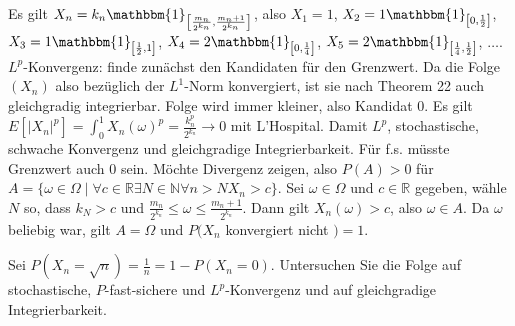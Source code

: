 \documentclass{article}
\begin{document}
Es gilt $X_n=k_n\mathbbm{1}_{\left[\frac{m_n}{2^{k_n}},\frac{m_n+1}{2^{k_n}}\right]}$, also $X_1=1$, $X_2=1\mathbbm{1}_{\left[0,\frac{1}{2}\right]}$, $X_3=1\mathbbm{1}_{\left[\frac{1}{2},1\right]}$, $X_4=2\mathbbm{1}_{\left[0,\frac{1}{4}\right]}$, $X_5=2\mathbbm{1}_{\left[\frac{1}{4},\frac{1}{2}\right]}$, $\dots$.
$L^p$-Konvergenz: finde zunächst den Kandidaten für den Grenzwert.
Da die Folge $(X_n)$ also bezüglich der $L^1$-Norm konvergiert, ist sie nach Theorem 22 auch gleichgradig integrierbar. Folge wird immer kleiner, also Kandidat 0.
Es gilt $E[|X_n|^p]=\int_0^1 X_n(\omega)^p=\frac{k_n^p}{2^{k_n}}\to0$ mit L'Hospital.
Damit $L^p$, stochastische, schwache Konvergenz und gleichgradige Integrierbarkeit.
Für f.s. müsste Grenzwert auch 0 sein.
Möchte Divergenz zeigen, also $P(A)>0$ für $A=\{\omega\in\Omega\mid\forall c\in\mathbb{R}\exists N\in\mathbb{N}\forall n>N X_n>c\}$.
Sei $\omega\in\Omega$ und $c\in\mathbb{R}$ gegeben, wähle $N$ so, dass $k_N>c$ und $\frac{m_n}{2^{k_n}}\leq\omega\leq\frac{m_n+1}{2^{k_n}}$.
Dann gilt $X_n(\omega)>c$, also $\omega\in A$.
Da $\omega$ beliebig war, gilt $A=\Omega$ und $P(X_n$ konvergiert nicht $)=1$.

Sei $P(X_n=\sqrt{n})=\frac{1}{n}=1-P(X_n=0)$.
Untersuchen Sie die Folge auf stochastische, $P$-fast-sichere und $L^p$-Konvergenz und auf gleichgradige Integrierbarkeit.


\end{document}
